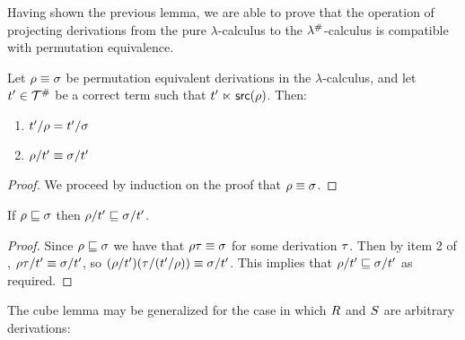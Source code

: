 Having shown the previous lemma, we are able to
prove that the operation of projecting derivations from the pure
$\lambda$-calculus to the $\lambda^{\mathtt{\#}}$-calculus is compatible with
permutation equivalence.

\begin{proposition}[Compatibility] %
Let $\rho \equiv \sigma$ be permutation equivalent derivations in the $\lambda$-calculus,
and let $t' \in \mathcal{T}^{\mathtt{\#}}$ be a correct term such that $t' \mathrel{\ltimes} \mathsf{src}(\rho)$.
Then:
\begin{enumerate}
\item $t'/\rho = t'/\sigma$
\item $\rho/t' \equiv \sigma/t'$
\end{enumerate}
\end{proposition}
\begin{proof}
We proceed by induction on the proof that $\rho \equiv \sigma$.
\end{proof}

\begin{corollary}
If $\rho \sqsubseteq \sigma$
then $\rho/t' \sqsubseteq \sigma/t'$.
\end{corollary}
\begin{proof}
Since $\rho \sqsubseteq \sigma$ we have that $\rho\tau \equiv \sigma$
for some derivation $\tau$.
Then by item 2 of ,
$\rho\tau/t' \equiv \sigma/t'$,
so $(\rho/t')(\tau/(t'/\rho)) \equiv \sigma/t'$.
This implies that $\rho/t' \sqsubseteq \sigma/t'$ as required.
\end{proof}

The cube lemma may be generalized for the case in which $R$ and $S$ are arbitrary derivations:

